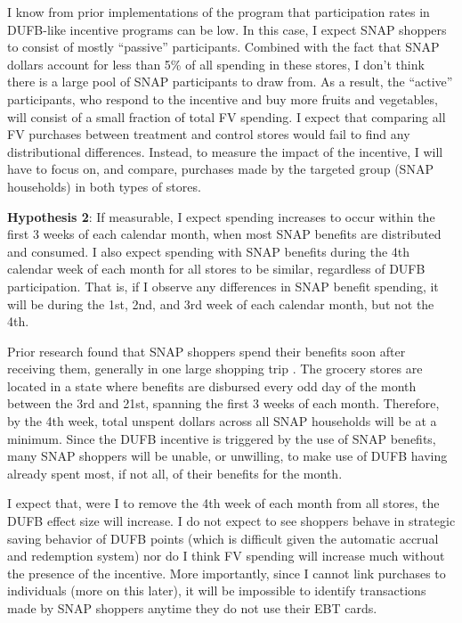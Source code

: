 \documentclass[12pt,letterpaperpaper,]{book}
\begin{document}
I know from prior implementations of the program that participation
rates in DUFB-like incentive programs can be low. In this case, I expect
SNAP shoppers to consist of mostly ``passive'' participants. Combined
with the fact that SNAP dollars account for less than 5\% of all
spending in these stores, I don't think there is a large pool of SNAP
participants to draw from. As a result, the ``active'' participants, who
respond to the incentive and buy more fruits and vegetables, will
consist of a small fraction of total FV spending. I expect that
comparing all FV purchases between treatment and control stores would
fail to find any distributional differences. Instead, to measure the
impact of the incentive, I will have to focus on, and compare, purchases
made by the targeted group (SNAP households) in both types of stores.

\textbf{Hypothesis 2}: If measurable, I expect spending increases to
occur within the first 3 weeks of each calendar month, when most SNAP
benefits are distributed and consumed. I also expect spending with SNAP
benefits during the 4th calendar week of each month for all stores to be
similar, regardless of DUFB participation. That is, if I observe any
differences in SNAP benefit spending, it will be during the 1st, 2nd,
and 3rd week of each calendar month, but not the 4th.

Prior research found that SNAP shoppers spend their benefits soon after
receiving them, generally in one large shopping trip
\citep{wiig_art_2009, damon_first_2013}. The grocery stores are located
in a state where benefits are disbursed every odd day of the month
between the 3rd and 21st, spanning the first 3 weeks of each month.
Therefore, by the 4th week, total unspent dollars across all SNAP
households will be at a minimum. Since the DUFB incentive is triggered
by the use of SNAP benefits, many SNAP shoppers will be unable, or
unwilling, to make use of DUFB having already spent most, if not all, of
their benefits for the month.

I expect that, were I to remove the 4th week of each month from all
stores, the DUFB effect size will increase. I do not expect to see
shoppers behave in strategic saving behavior of DUFB points (which is
difficult given the automatic accrual and redemption system) nor do I
think FV spending will increase much without the presence of the
incentive. More importantly, since I cannot link purchases to
individuals (more on this later), it will be impossible to identify
transactions made by SNAP shoppers anytime they do not use their EBT
cards.
\end{document}
